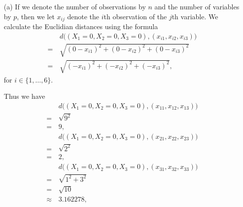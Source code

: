 
\begin{itemize}
    \item[(a)] If we denote the number of observations by $n$ and the number of 
    variables by $p$, then we let $x_{ij}$ denote the $i$th observation of the 
    $j$th variable. We calculate the Euclidian distances using the formula
    \begin{equation*}
        \begin{split}
            &d\bigl((X_1 = 0, X_2 = 0, X_3 = 0), (x_{i1}, x_{i2}, x_{i3})\bigr) \\
            = \, &\sqrt{{(0 - x_{i1})}^2 + {(0 - x_{i2})}^2 + {(0 - x_{i3})}^2} \\
            = \, &\sqrt{{(-x_{i1})}^2 + {(-x_{i2})}^2 + {(-x_{i3})}^2},
        \end{split}
    \end{equation*}
    for $i \in \lbrace 1, \dotsc, 6\rbrace$.\par
    Thus we have
    \begin{equation*}
        \begin{split}
            &d\bigl((X_1 = 0, X_2 = 0, X_3 = 0), (x_{11}, x_{12}, x_{13})\bigr) \\
            = \, &\sqrt{9^2} \\ 
            = \, &9,
        \end{split}
    \end{equation*}
    \begin{equation*}
        \begin{split}
            &d\bigl((X_1 = 0, X_2 = 0, X_3 = 0), (x_{21}, x_{22}, x_{23})\bigr) \\ 
            = \, &\sqrt{2^2} \\ 
            = \, &2,
        \end{split}
    \end{equation*}
    \begin{equation*}
        \begin{split}
            &d\bigl((X_1 = 0, X_2 = 0, X_3 = 0), (x_{31}, x_{32}, x_{33})\bigr) \\ 
            = \, &\sqrt{1^2 + 3^2} \\
            = \, &\sqrt{10} \\
            \approx \, &3.162278,
        \end{split}
    \end{equation*}
    \begin{equation*}
        \begin{split}

\end{split}
\end{equation*}
\end{itemize}
